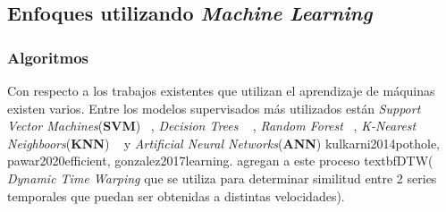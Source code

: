 	\subsection{Enfoques utilizando \emph{Machine Learning}}
		\subsubsection{Algoritmos}
			Con respecto a los trabajos existentes que utilizan el aprendizaje de máquinas existen varios. Entre los modelos supervisados
			más utilizados están \emph{Support Vector Machines}(\textbf{SVM}) ~, \emph{Decision Trees} ~ , \emph{Random Forest} ~, \emph{K-Nearest Neighboors}(\textbf{KNN})
			~ y \emph{Artificial Neural Networks}(\textbf{ANN}) \brackcite
			{kulkarni2014pothole, pawar2020efficient, gonzalez2017learning}.  agregan a este proceso textbf{DTW}(\emph{
			Dynamic Time Warping} que se utiliza para determinar similitud entre 2 series temporales que puedan ser obtenidas a distintas velocidades).

